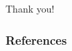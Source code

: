 \documentclass[aspectratio=169,xcolor=dvipsnames]{beamer}
\begin{document}
\begin{frame}
    \Huge{\centerline{Thank you!}}
\end{frame}




\appendix



\begin{frame}[allowframebreaks]
        \frametitle{References}
 

\end{frame}


\end{document}
